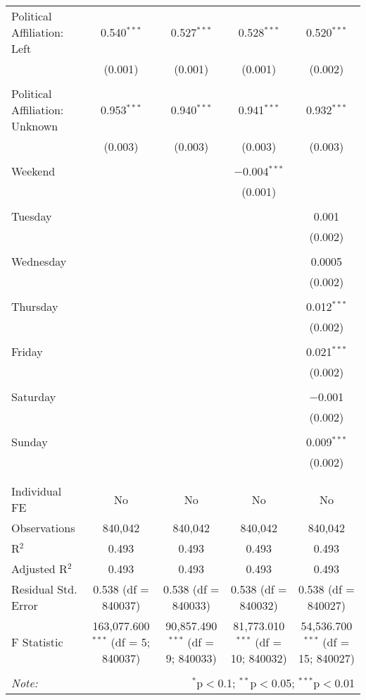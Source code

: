 \documentclass[
]{article}
\begin{document}
\begin{table}[!htbp]
{\begin{tabular}{@{\extracolsep{5pt}}lcccc}
 Political Affiliation: Left & 0.540$^{***}$ & 0.527$^{***}$ & 0.528$^{***}$ & 0.520$^{***}$ \\ 
  & (0.001) & (0.001) & (0.001) & (0.002) \\ 
  & & & & \\ 
 Political Affiliation: Unknown & 0.953$^{***}$ & 0.940$^{***}$ & 0.941$^{***}$ & 0.932$^{***}$ \\ 
  & (0.003) & (0.003) & (0.003) & (0.003) \\ 
  & & & & \\ 
 Weekend &  &  & $-$0.004$^{***}$ &  \\ 
  &  &  & (0.001) &  \\ 
  & & & & \\ 
 Tuesday &  &  &  & 0.001 \\ 
  &  &  &  & (0.002) \\ 
  & & & & \\ 
 Wednesday &  &  &  & 0.0005 \\ 
  &  &  &  & (0.002) \\ 
  & & & & \\ 
 Thursday &  &  &  & 0.012$^{***}$ \\ 
  &  &  &  & (0.002) \\ 
  & & & & \\ 
 Friday &  &  &  & 0.021$^{***}$ \\ 
  &  &  &  & (0.002) \\ 
  & & & & \\ 
 Saturday &  &  &  & $-$0.001 \\ 
  &  &  &  & (0.002) \\ 
  & & & & \\ 
 Sunday &  &  &  & 0.009$^{***}$ \\ 
  &  &  &  & (0.002) \\ 
  & & & & \\ 
\hline \\[-1.8ex] 
Individual FE & No & No & No & No \\ 
Observations & 840,042 & 840,042 & 840,042 & 840,042 \\ 
R$^{2}$ & 0.493 & 0.493 & 0.493 & 0.493 \\ 
Adjusted R$^{2}$ & 0.493 & 0.493 & 0.493 & 0.493 \\ 
Residual Std. Error & 0.538 (df = 840037) & 0.538 (df = 840033) & 0.538 (df = 840032) & 0.538 (df = 840027) \\ 
F Statistic & 163,077.600$^{***}$ (df = 5; 840037) & 90,857.490$^{***}$ (df = 9; 840033) & 81,773.010$^{***}$ (df = 10; 840032) & 54,536.700$^{***}$ (df = 15; 840027) \\ 
\hline 
\hline \\[-1.8ex] 
\textit{Note:}  & \multicolumn{4}{r}{$^{*}$p$<$0.1; $^{**}$p$<$0.05; $^{***}$p$<$0.01} \\ 
\end{tabular}
} 
\end{table} 
\newpage
\end{document}
